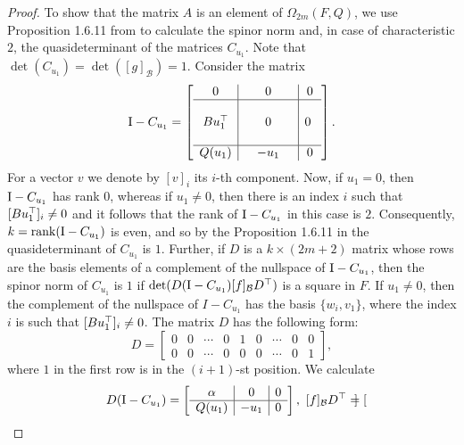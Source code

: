 \begin{proof}
    To show that the matrix $A$ is an element of $\Omega_{2m}(F,Q)$,
    we use Proposition 1.6.11 from \cite{BrayHoltRD} to calculate the spinor 
    norm and, in case of characteristic $2$, the quasideterminant of the
    matrices $C_{u_1}$. Note that $\det(C_{u_1}) = \det([g]_{\mathcal{B}}) = 1$.
    Consider the matrix
    \begin{equation*}
	\mathord{\mathrm{I}}-C_{u_1} = \left[
	    \begin{array}{c|c|c}
		0 & 0 & 0  \\ \hline 
		 & & \\
		Bu_1^\top &\ \ \ \ \ 0\ \ \ \ \  & 0\  \\ 
		 & & \\ \hline 
		Q(u_1) & -u_1 & 0
	    \end{array}
	\right].
    \end{equation*}
    For a vector $v$ we denote by $[v]_i$ its $i$-th component. Now, 
    if $u_1 = 0$, then $\mathord{\mathrm{I}}-C_{u_1}$ has rank $0$, whereas if $u_1 \neq 0$, then
    there is an index $i$ such that $[Bu_1^\top]_i \neq 0$ and it follows that
    the rank of $\mathord{\mathrm{I}}-C_{u_1}$ in this case is $2$. Consequently, $k=\operatorname{rank}(\mathord{\mathrm{I}}-C_{u_1})$ is
    even, and so by the Proposition 1.6.11 in \cite{BrayHoltRD} the quasideterminant of $C_{u_1}$
    is $1$. Further, if $D$ is a $k\times (2m+2)$ matrix whose rows are the basis
    elements of a complement of the nullspace of $\mathord{\mathrm{I}}-C_{u_1}$, then the spinor norm of
     $C_{u_1}$ is $1$
    if $\det(D(\mathord{\mathrm{I}}-C_{u_1}) [f]_{\mathcal{B}} D^\top)$ is a square in $F$. If $u_1 \neq 0$,
    then the complement of the nullspace of $I-C_{u_1}$ has the basis
    $\{ w_i, v_1 \}$, where the index $i$ is such that $[Bu_1^\top]_i \neq 0$. 
    The matrix $D$ has the following form:
    \begin{equation*}
	D = \begin{bmatrix}
	    0 & 0 & \cdots & 0 & 1 & 0 & \cdots & 0 & 0 \\
	    0 & 0 & \cdots & 0 & 0 & 0 & \cdots & 0 & 1
	\end{bmatrix},
    \end{equation*}
    where $1$ in the first row is in the $(i+1)$-st position. We calculate
    \begin{equation*}
	D(\II-C_{u_1}) = \left[
	    \begin{array}{c|c|c}
		\alpha & 0 & 0 \\ \hline
		Q(u_1) & -u_1 & 0
	    \end{array}
	\right],\ 
	[f]_{\mathcal{B}} D^\T = \begin{bmatrix}

\end{bmatrix}
\end{equation*}
\end{proof}

